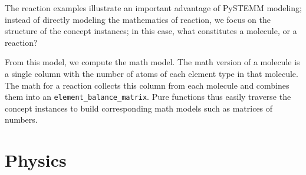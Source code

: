 \documentclass[letterpaper,compsoc,twoside]{IEEEtran}
\providecommand*{\DUrole}[2]{\ifcsname DUrole#1\endcsname \csname DUrole#1\endcsname{#2}\else \ifcsname docutilsrole#1\endcsname \csname docutilsrole#1\endcsname{#2}\else #2\fi \fi }
\begin{document}
The reaction examples illustrate an important advantage of PySTEMM  modeling; instead of directly modeling the mathematics of reaction, we focus on the structure of the concept instances; in this case, what constitutes a molecule, or a reaction?

From this model, we compute the math model. The math version of a molecule is a single column with the number of atoms of each element type in that molecule. The math for a reaction collects this column from each molecule and combines them into an \texttt{element\_balance\_matrix}. Pure functions thus  easily traverse the concept instances to build corresponding math models such as matrices of numbers.

\section{Physics\label{physics}}
\begin{figure*}[]\noindent{}
\caption{\texttt{Ball} in motion: functions of time as code, graphs, animation \DUrole{label}{phyfig}}
\end{figure*}
\end{document}
